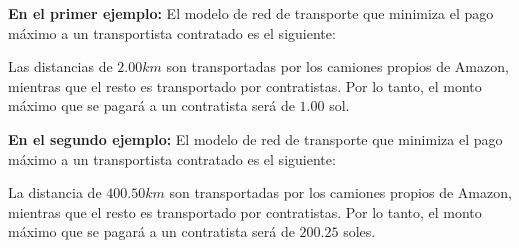 \exampleCases

\begin{example}
\end{example}

\explanationText


\textbf{En el primer ejemplo:} El modelo de red de transporte que minimiza el pago máximo a un transportista contratado es el siguiente:

\begin{figure}[h]
    \centering
    
\end{figure}

Las distancias de $2.00 km$ son transportadas por los camiones propios de Amazon, mientras que el resto es transportado por contratistas. Por lo tanto, el monto máximo que se pagará a un contratista será de $1.00$ sol.

\textbf{En el segundo ejemplo:} El modelo de red de transporte que minimiza el pago máximo a un transportista contratado es el siguiente:

\begin{figure}[h]
    \centering
    
\end{figure}

La distancia de $400.50 km$ son transportadas por los camiones propios de Amazon, mientras que el resto es transportado por contratistas. Por lo tanto, el monto máximo que se pagará a un contratista será de $200.25$ soles.
